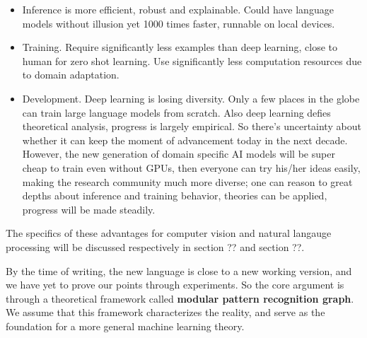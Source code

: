 \documentclass[../main.tex]{subfiles}
\begin{document}
\begin{itemize}
	\item Inference is more efficient, robust and explainable. Could have language models without illusion yet 1000 times faster, runnable on local devices.
	\item Training. Require significantly less examples than deep learning, close to human for zero shot learning. Use significantly less computation resources due to domain adaptation.
	\item Development. Deep learning is losing diversity. Only a few places in the globe can train large language models from scratch. Also deep learning defies theoretical analysis, progress is largely empirical. So there's uncertainty about whether it can keep the moment of advancement today in the next decade. However, the new generation of domain specific AI models will be super cheap to train even without GPUs, then everyone can try his/her ideas easily, making the research community much more diverse; one can reason to great depths about inference and training behavior, theories can be applied, progress will be made steadily.
\end{itemize}

The specifics of these advantages for computer vision and natural langauge processing will be discussed respectively in section ?? and section ??.

By the time of writing, the new language is close to a new working version, and we have yet to prove our points through experiments. So the core argument is through a theoretical framework called \textbf{modular pattern recognition graph}. We assume that this framework characterizes the reality, and serve as the foundation for a more general machine learning theory.
\end{document}
